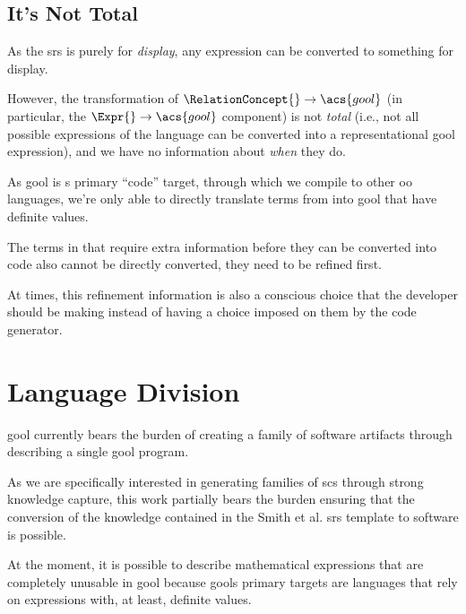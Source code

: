 \subsection{It's Not Total}

As the \acs{srs} is purely for \textit{display}, any \Expr{} expression can be
converted to something for display.

However, the transformation of \(\RelationConcept{} \rightarrow \acs{gool}\) (in
particular, the \(\Expr{} \rightarrow \acs{gool}\) component) is not
\textit{total} (i.e., not all possible expressions of the \Expr{} language can
be converted into a representational \acs{gool} expression), and we have no
information about \textit{when} they do.

As \acs{gool} is \Expr{}s primary ``code'' target, through which we compile to
other \acs{oo} languages, we're only able to directly translate terms from
\Expr{} into \acs{gool} that have definite values.

The terms in \Expr{} that require extra information before they can be converted
into code also cannot be directly converted, they need to be refined first.

At times, this refinement information is also a conscious choice that the
developer should be making instead of having a choice imposed on them by the
code generator.












\section{Language Division}

\acs{gool} currently bears the burden of creating a family of software artifacts
through describing a single \acs{gool} program.

As we are specifically interested in generating families of \acs{scs} through
strong knowledge capture, this work partially bears the burden ensuring that the
conversion of the knowledge contained in the Smith et al. \acs{srs} template
\cite{SmithAndLai2005} to software is possible.

At the moment, it is possible to describe mathematical expressions that are
completely unusable in \acs{gool} because \acsp{gool} primary targets are
languages that rely on expressions with, at least, definite values.

